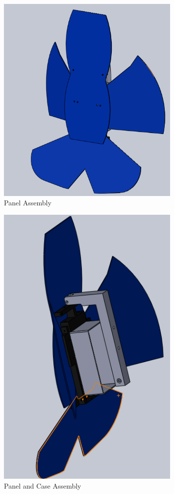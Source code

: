 \documentclass{article}
\numberwithin{figure}{section}
\numberwithin{equation}{section}
\begin{document}
{\begin{figure}[H]
	\centering
	\includegraphics[width=0.8\textwidth]{NewAssembly}
	\caption{Panel Assembly}
	\label{fig:append_panel_assembly}
\end{figure}

\begin{figure}[H]
	\centering
	\includegraphics[width=0.8\textwidth]{NewAssembly2}
	\caption{Panel and Case Assembly}
	\label{fig:append_panel_case_assembly}
\end{figure}

}
\end{document}
